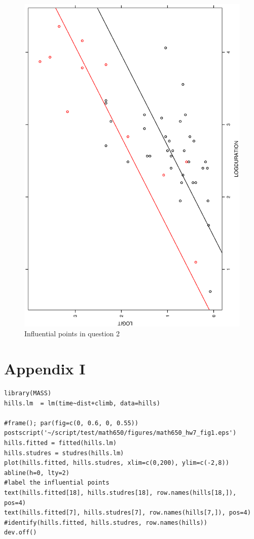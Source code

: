 \documentclass[a4paper,10pt]{article}
\begin{document}
\begin{figure}
\includegraphics[angle=-90, width=1\textwidth]{figures/math650_hw7_fig8.eps}
\caption{Influential points in question 2}\label{f8}
\end{figure}

\section{Appendix I}
\label{appendix1}
\begin{verbatim}
library(MASS)
hills.lm  = lm(time~dist+climb, data=hills)

#frame(); par(fig=c(0, 0.6, 0, 0.55))
postscript('~/script/test/math650/figures/math650_hw7_fig1.eps')
hills.fitted = fitted(hills.lm)
hills.studres = studres(hills.lm)
plot(hills.fitted, hills.studres, xlim=c(0,200), ylim=c(-2,8))
abline(h=0, lty=2)
#label the influential points
text(hills.fitted[18], hills.studres[18], row.names(hills[18,]), pos=4)
text(hills.fitted[7], hills.studres[7], row.names(hills[7,]), pos=4)
#identify(hills.fitted, hills.studres, row.names(hills))
dev.off()
\end{verbatim}
\end{document}
